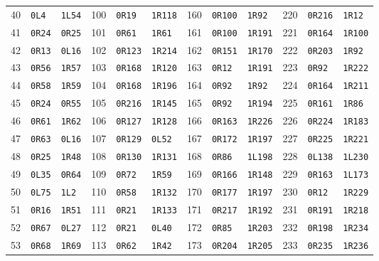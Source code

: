 \begin{tabular}{rll@{\hspace{12pt}}rll@{\hspace{12pt}}rll@{\hspace{12pt}}rll}
40 & \texttt{0L4} & \texttt{1L54} & 100 & \texttt{0R19} & \texttt{1R118} & 160 & \texttt{0R100} & \texttt{1R92} & 220 & \texttt{0R216} & \texttt{1R12}\\
41 & \texttt{0R24} & \texttt{0R25} & 101 & \texttt{0R61} & \texttt{1R61} & 161 & \texttt{0R100} & \texttt{1R191} & 221 & \texttt{0R164} & \texttt{1R100}\\
42 & \texttt{0R13} & \texttt{0L16} & 102 & \texttt{0R123} & \texttt{1R214} & 162 & \texttt{0R151} & \texttt{1R170} & 222 & \texttt{0R203} & \texttt{1R92}\\
43 & \texttt{0R56} & \texttt{1R57} & 103 & \texttt{0R168} & \texttt{1R120} & 163 & \texttt{0R12} & \texttt{1R191} & 223 & \texttt{0R92} & \texttt{1R222}\\
44 & \texttt{0R58} & \texttt{1R59} & 104 & \texttt{0R168} & \texttt{1R196} & 164 & \texttt{0R92} & \texttt{1R92} & 224 & \texttt{0R164} & \texttt{1R211}\\
45 & \texttt{0R24} & \texttt{0R55} & 105 & \texttt{0R216} & \texttt{1R145} & 165 & \texttt{0R92} & \texttt{1R194} & 225 & \texttt{0R161} & \texttt{1R86}\\
46 & \texttt{0R61} & \texttt{1R62} & 106 & \texttt{0R127} & \texttt{1R128} & 166 & \texttt{0R163} & \texttt{1R226} & 226 & \texttt{0R224} & \texttt{1R183}\\
47 & \texttt{0R63} & \texttt{0L16} & 107 & \texttt{0R129} & \texttt{0L52} & 167 & \texttt{0R172} & \texttt{1R197} & 227 & \texttt{0R225} & \texttt{1R221}\\
48 & \texttt{0R25} & \texttt{1R48} & 108 & \texttt{0R130} & \texttt{1R131} & 168 & \texttt{0R86} & \texttt{1L198} & 228 & \texttt{0L138} & \texttt{1L230}\\
49 & \texttt{0L35} & \texttt{0R64} & 109 & \texttt{0R72} & \texttt{1R59} & 169 & \texttt{0R166} & \texttt{1R148} & 229 & \texttt{0R163} & \texttt{1L173}\\
50 & \texttt{0L75} & \texttt{1L2} & 110 & \texttt{0R58} & \texttt{1R132} & 170 & \texttt{0R177} & \texttt{1R197} & 230 & \texttt{0R12} & \texttt{1R229}\\
51 & \texttt{0R16} & \texttt{1R51} & 111 & \texttt{0R21} & \texttt{1R133} & 171 & \texttt{0R217} & \texttt{1R192} & 231 & \texttt{0R191} & \texttt{1R218}\\
52 & \texttt{0R67} & \texttt{0L27} & 112 & \texttt{0R21} & \texttt{0L40} & 172 & \texttt{0R85} & \texttt{1R203} & 232 & \texttt{0R198} & \texttt{1R234}\\
53 & \texttt{0R68} & \texttt{1R69} & 113 & \texttt{0R62} & \texttt{1R42} & 173 & \texttt{0R204} & \texttt{1R205} & 233 & \texttt{0R235} & \texttt{1R236}\\

\end{tabular}
